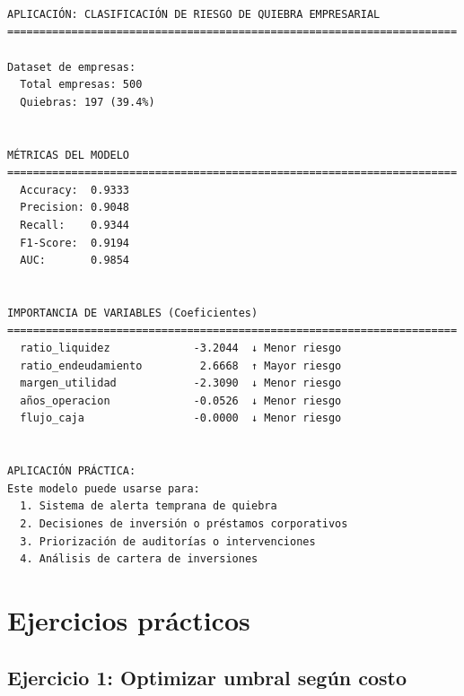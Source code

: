 \documentclass[
  doc,
  floatsintext,
  longtable,
  a4paper,
  nolmodern,
  notxfonts,
  notimes,
  12pt,
  colorlinks=true,linkcolor=blue,citecolor=blue,urlcolor=blue]{apa7}
\begin{document}
\begin{verbatim}



APLICACIÓN: CLASIFICACIÓN DE RIESGO DE QUIEBRA EMPRESARIAL
======================================================================

Dataset de empresas:
  Total empresas: 500
  Quiebras: 197 (39.4%)


MÉTRICAS DEL MODELO
======================================================================
  Accuracy:  0.9333
  Precision: 0.9048
  Recall:    0.9344
  F1-Score:  0.9194
  AUC:       0.9854


IMPORTANCIA DE VARIABLES (Coeficientes)
======================================================================
  ratio_liquidez             -3.2044  ↓ Menor riesgo
  ratio_endeudamiento         2.6668  ↑ Mayor riesgo
  margen_utilidad            -2.3090  ↓ Menor riesgo
  años_operacion             -0.0526  ↓ Menor riesgo
  flujo_caja                 -0.0000  ↓ Menor riesgo


APLICACIÓN PRÁCTICA:
Este modelo puede usarse para:
  1. Sistema de alerta temprana de quiebra
  2. Decisiones de inversión o préstamos corporativos
  3. Priorización de auditorías o intervenciones
  4. Análisis de cartera de inversiones
\end{verbatim}

\section{Ejercicios prácticos}\label{ejercicios-pruxe1cticos}

\subsection{Ejercicio 1: Optimizar umbral según
costo}\label{ejercicio-1-optimizar-umbral-seguxfan-costo}
\end{document}

